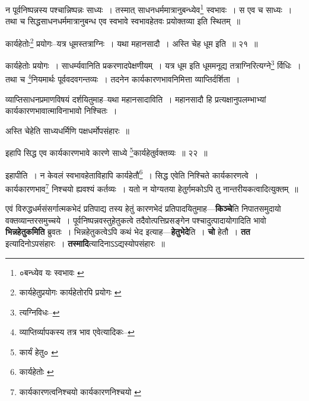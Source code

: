 \documentclass[article,12pt,a4paper]{memoir}
\begin{document}
	  \pstart न पूर्वनिष्पन्नस्य पश्चान्निष्पन्नः साध्यः । तस्मात् साधनधर्ममात्रानुबन्ध्येव\footnote{०बन्ध्येव यः स्वभावः \cite{dp-msB} \cite{dp-msC} \cite{dp-msD} \cite{dp-edE}} स्वभावः । स एव च साध्यः । तथा च सिद्धसाधनधर्ममात्रानुबन्ध एव स्वभावे स्वभावहेतवः प्रयोक्तव्या इति स्थितम् ॥
	\pend
       
	  \bigskip
	  \begingroup
	

	  \pstart कार्यहेतोः\footnote{कार्यहेतुप्रयोगः \cite{dp-msC} कार्यहेतोरपि प्रयोगः \cite{dp-msB} \cite{dp-msD} \cite{dp-edP} \cite{dp-edH} \cite{dp-edE} \cite{dp-edN}} प्रयोगः--यत्र धूमस्तत्राग्निः । यथा महानसादौ । अस्ति चेह धूम इति ॥ २१ ॥
	\pend
      
	  \endgroup
	 

	  \pstart कार्यहेतोः प्रयोगः । साधर्म्यवानिति प्रकरणादपेक्षणीयम् । यत्र धूम इति धूममनूद्य तत्राग्निरित्यग्ने\footnote{त्यग्निविधः--\cite{dp-msB}} र्विधिः । तथा च \footnote{व्याप्तिर्व्यापकस्य तत्र भाव एवेत्यादिकः--\cite{dp-msD-n}}\-नियमार्थः पूर्ववदवगन्तव्यः । तदनेन कार्यकारणभावनिमित्ता व्याप्तिर्दर्शिता ।
	\pend
       

	  \pstart व्याप्तिसाधनप्रमाणविषयं दर्शयितुमाह--यथा महानसादाविति । महानसादौ हि प्रत्यक्षानुपलम्भाभ्यां कार्यकारणभावात्माविनाभावो निश्चितः ।
	\pend
       

	  \pstart अस्ति चेहेति साध्यधर्मिणि पक्षधर्मोपसंहारः ॥
	\pend
       
	  \bigskip
	  \begingroup
	

	  \pstart इहापि सिद्ध एव कार्यकारणभावे कारणे साध्ये \footnote{कार्यं हेतु० \cite{dp-msC} \cite{dp-msD}}\-कार्यहेतुर्वक्तव्यः ॥ २२ ॥
	\pend
      
	  \endgroup
	 

	  \pstart इहापीति । न केवलं स्वभावहेताविहापि कार्यहेतौ\footnote{कार्यहेतोः \cite{dp-msB}} । सिद्ध एवेति निश्चिते कार्यकारणत्वे । कार्यकारणभाव\footnote{कार्यकारणत्वनिश्चयो \cite{dp-msA} \cite{dp-edP} \cite{dp-edH} \cite{dp-edN} कार्यकारणनिश्चयो \cite{dp-msC}} निश्चयो ह्यवश्यं कर्तव्यः । यतो न योग्यतया हेतुर्गमकोऽपि तु नान्तरीयकत्वादित्युक्तम् ॥
	\pend
      
	  \endgroup
	

	  \pstart एवं विरुद्धधर्मसंसर्गात्मकभेदं प्रतिपाद्य तस्य हेतुं कारणभेदं प्रतिपादयितुमाह—\textbf{किञ्चे}ति निपातसमुदायो वक्तव्यान्तरसमुच्चये । पूर्वनिष्पन्नवस्तुहेतुकत्वे तदैवोत्पत्तिप्रसङ्गेन पश्चादुत्पादायोगादिति भावो \textbf{भिन्नहेतुकमिति} ब्रुवतः । भिन्नहेतुकत्वेऽपि कथं भेद इत्याह—\textbf{हेतुभेदे}ति । \textbf{चो} हेतौ । \textbf{तत} इत्यादिनोऽपसंहारः । \textbf{तस्मादि}त्यादिनाऽऽद्यस्योपसंहारः ॥
	\pend
      
\end{document}
